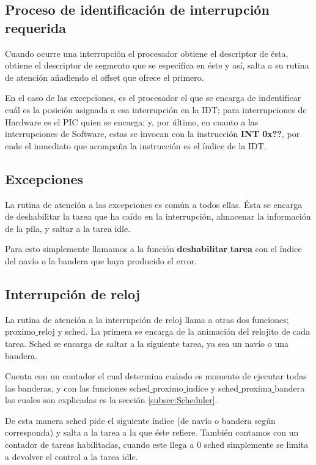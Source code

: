 \subsection{Proceso de identificación de interrupción requerida}
\par{Cuando ocurre una interrupción el procesador obtiene el descriptor de ésta, obtiene el descriptor de segmento que se especifica en éste y así, salta a su rutina de atención añadiendo el offset que ofrece el primero.}
\par{En el caso de las excepciones, es el procesador el que se encarga de indentificar cuál es la posición asignada a esa interrupción en la IDT; para interrupciones de Hardware es el PIC quien se encarga; y, por último, en cuanto a las interrupciones de Software, estas se invocan con la instrucción \textbf{INT 0x??}, por ende el inmediato que acompaña la instrucción es el índice de la IDT.}

\subsection{Excepciones}
\par{La rutina de atención a las excepciones es común a todos ellas. Ésta se encarga de deshabilitar la tarea que ha caído en la interrupción, almacenar la información de la pila, y saltar a la tarea idle.}
\par{Para esto simplemente llamamos a la función \textbf{deshabilitar$\_$tarea} con el índice del navío o la bandera que haya producido el error.}
\subsection{Interrupción de reloj}
\par{La rutina de atención a la interrupción de reloj llama a otras dos funciones; proximo$\_$reloj y sched. La primera se encarga de la animación del relojito de cada tarea. Sched se encarga de saltar a la siguiente tarea, ya sea un navío o una bandera.}
\par{Cuenta con un contador el cual determina cuándo es momento de ejecutar todas las banderas, y con las funciones sched$\_$proximo$\_$indice y sched$\_$proxima$\_$bandera las cuales son explicadas es la sección \ref{subsec:Scheduler}.}
\par{De esta manera sched pide el siguiente índice (de navío o bandera según corresponda) y salta a la tarea a la que éste refiere. También contamos con un contador de tareas habilitadas, cuando este llega a 0 sched simplemente se limita a devolver el control a la tarea idle.}
